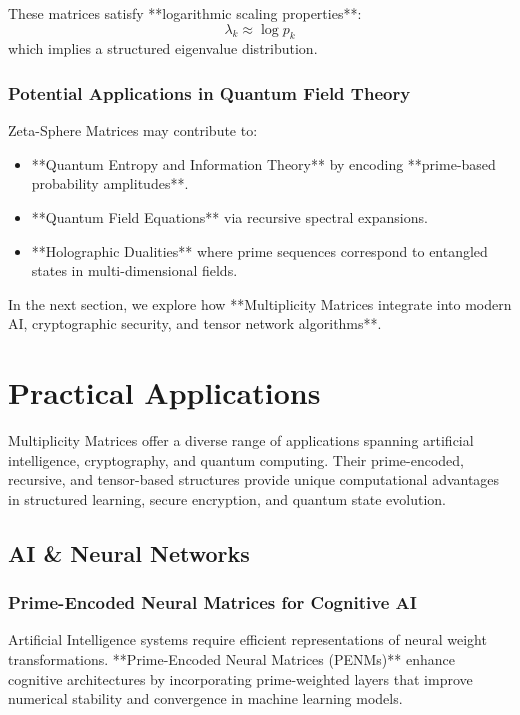 \documentclass{article}
\theoremstyle{plain}
\begin{document}
These matrices satisfy **logarithmic scaling properties**:
\begin{equation}
    \lambda_k \approx \log p_k
\end{equation}
which implies a structured eigenvalue distribution.

\subsubsection{Potential Applications in Quantum Field Theory}
Zeta-Sphere Matrices may contribute to:
\begin{itemize}
    \item **Quantum Entropy and Information Theory** by encoding **prime-based probability amplitudes**.
    \item **Quantum Field Equations** via recursive spectral expansions.
    \item **Holographic Dualities** where prime sequences correspond to entangled states in multi-dimensional fields.
\end{itemize}

In the next section, we explore how **Multiplicity Matrices integrate into modern AI, cryptographic security, and tensor network algorithms**.
\section{Practical Applications}

Multiplicity Matrices offer a diverse range of applications spanning artificial intelligence, cryptography, and quantum computing. Their prime-encoded, recursive, and tensor-based structures provide unique computational advantages in structured learning, secure encryption, and quantum state evolution.

\subsection{AI \& Neural Networks}

\subsubsection{Prime-Encoded Neural Matrices for Cognitive AI}
Artificial Intelligence systems require efficient representations of neural weight transformations. **Prime-Encoded Neural Matrices (PENMs)** enhance cognitive architectures by incorporating prime-weighted layers that improve numerical stability and convergence in machine learning models.
\end{document}
